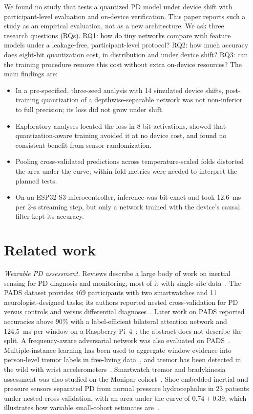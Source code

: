 \documentclass[preprint,12pt]{elsarticle}
\begin{document}
We found no study that tests a quantized PD model under device shift with participant-level evaluation and on-device verification. This paper reports such a study as an empirical evaluation, not as a new architecture. We ask three research questions (RQs). RQ1: how do tiny networks compare with feature models under a leakage-free, participant-level protocol? RQ2: how much accuracy does eight-bit quantization cost, in distribution and under device shift? RQ3: can the training procedure remove this cost without extra on-device resources? The main findings are:
\begin{itemize}
  \item In a pre-specified, three-seed analysis with 14 simulated device shifts, post-training quantization of a depthwise-separable network was not non-inferior to full precision; its loss did not grow under shift.
  \item Exploratory analyses located the loss in 8-bit activations, showed that quantization-aware training avoided it at no device cost, and found no consistent benefit from sensor randomization.
  \item Pooling cross-validated predictions across temperature-scaled folds distorted the area under the curve; within-fold metrics were needed to interpret the planned tests.
  \item On an ESP32-S3 microcontroller, inference was bit-exact and took 12.6~ms per 2-s streaming step, but only a network trained with the device's causal filter kept its accuracy.
\end{itemize}

\section{Related work}
\label{sec:related}
\emph{Wearable PD assessment.} Reviews describe a large body of work on inertial sensing for PD diagnosis and monitoring, most of it with single-site data~\cite{Rovini2017,Sigcha2023rev}. The PADS dataset provides 469 participants with two smartwatches and 11 neurologist-designed tasks; its authors reported nested cross-validation for PD versus controls and versus differential diagnoses~\cite{Varghese2024}. Later work on PADS reported accuracies above 90\% with a label-efficient bilateral attention network and 124.5~ms per window on a Raspberry Pi~4~\cite{Zannat2026}; the abstract does not describe the split. A frequency-aware adversarial network was also evaluated on PADS~\cite{Zhao2025MFAM}. Multiple-instance learning has been used to aggregate window evidence into person-level tremor labels in free-living data~\cite{Papadopoulos2023,Ilse2018}, and tremor has been detected in the wild with wrist accelerometers~\cite{SanSegundo2020}. Smartwatch tremor and bradykinesia assessment was also studied on the Monipar cohort~\cite{Sigcha2021,Monipar2023}. Shoe-embedded inertial and pressure sensors separated PD from normal pressure hydrocephalus in 23 patients under nested cross-validation, with an area under the curve of $0.74 \pm 0.39$, which illustrates how variable small-cohort estimates are~\cite{Magni2026}.
\end{document}
